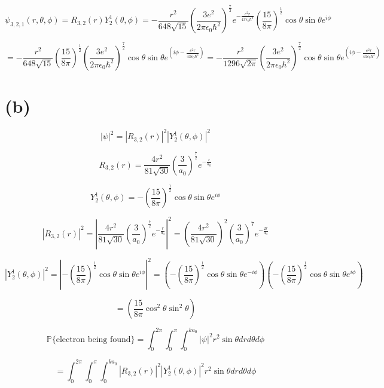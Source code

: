 \documentclass[11pt]{article}
\begin{document}
\vspace{2mm}
\[\psi_{3,2,1}(r,\theta,\phi)=R_{3,2}(r)Y^{1}_2(\theta,\phi)=-\frac{r^2}{648\sqrt{15}}
\left(
\frac{3e^2}{2\pi \epsilon_0\hbar^2}
\right)^\frac{7}{2}
e^{-\frac{e^2r}{4\pi\epsilon_0\hbar^2}}
\left(\frac{15}{8\pi}\right)^\frac{1}{2}
\cos{\theta}\sin{\theta}e^{i\phi}
\]

\vspace{2mm}
\[
=-\frac{r^2}{648\sqrt{15}}\left(\frac{15}{8\pi}\right)^\frac{1}{2}
\left(
\frac{3e^2}{2\pi \epsilon_0\hbar^2}
\right)^\frac{7}{2}
\cos{\theta}\sin{\theta}e^{\left(i\phi-\frac{e^2r}{4\pi\epsilon_0\hbar^2}\right)}=
-\frac{r^2}{1296\sqrt{2\pi}}
\left(
\frac{3e^2}{2\pi \epsilon_0\hbar^2}
\right)^\frac{7}{2}
\cos{\theta}\sin{\theta}e^{\left(i\phi-\frac{e^2r}{4\pi\epsilon_0\hbar^2}\right)}
\]

\section*{(b)}
\[|\psi|^2=|R_{3,2}(r)|^2|Y^1_2(\theta,\phi)|^2\]

\vspace{2mm}
\[R_{3,2}(r)=\frac{4r^2}{81\sqrt{30}}\left(\frac{3}{a_0}\right)^{\frac{7}{2}}e^{-\frac{r}{a_0}}\]

\vspace{2mm}
\[
Y^1_2(\theta,\phi)=-\left(\frac{15}{8\pi}\right)^\frac{1}{2}
\cos{\theta}\sin{\theta}e^{i\phi}
\]

\vspace{5mm}
\[|R_{3,2}(r)|^2=\left|\frac{4r^2}{81\sqrt{30}}\left(\frac{3}{a_0}\right)^{\frac{7}{2}}e^{-\frac{r}{a_0}}\right|^2=
\left(\frac{4r^2}{81\sqrt{30}}\right)^2\left(\frac{3}{a_0}\right)^7e^{-\frac{2r}{a_0}}
\]

\vspace{2mm}
\[|Y^1_2(\theta,\phi)|^2=\left|-\left(\frac{15}{8\pi}\right)^\frac{1}{2}
\cos{\theta}\sin{\theta}e^{i\phi}\right|^2=
\left(
-\left(\frac{15}{8\pi}\right)^\frac{1}{2}
\cos{\theta}\sin{\theta}e^{-i\phi}
\right)
\left(
-\left(\frac{15}{8\pi}\right)^\frac{1}{2}
\cos{\theta}\sin{\theta}e^{i\phi}
\right)\]

\vspace{2mm}
\[
=\left(\frac{15}{8\pi}\cos^2\theta\sin^2\theta\right)
\]

\vspace{5mm}
\[\mathbb{P}\{\text{electron being found}\}=\int^{2\pi}_0\int^\pi_0\int^{ka_0}_0|\psi|^2r^2\sin\theta drd\theta d\phi\]

\vspace{3mm}
\[=\int^{2\pi}_0\int^\pi_0\int^{ka_0}_0 |R_{3,2}(r)|^2|Y^1_2(\theta,\phi)|^2r^2\sin\theta drd\theta d\phi\]
\end{document}
